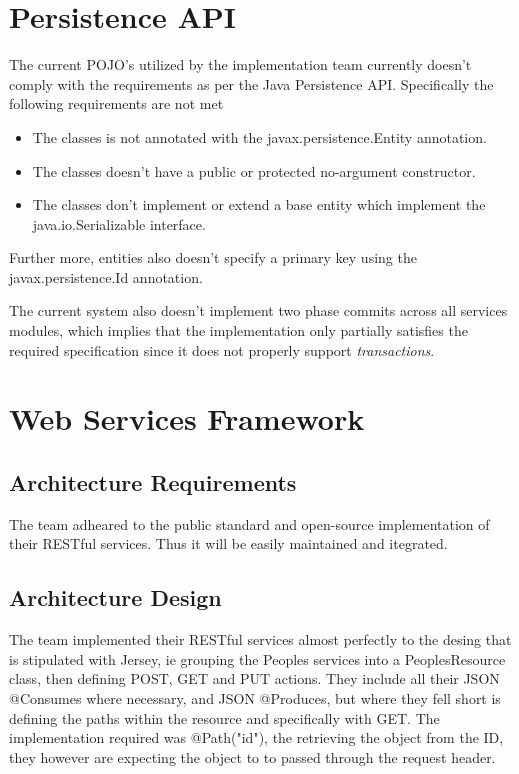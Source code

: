 \documentclass[a4paper,10pt]{article}
\begin{document}
\section{Persistence API}
The current POJO's utilized by the implementation team currently doesn't comply with the requirements as per the Java Persistence API.  Specifically the following requirements are not met
\begin{itemize}
	\item The classes is not annotated with the javax.persistence.Entity annotation.
	\item The classes doesn't have a public or protected no-argument constructor.
	\item The classes don't implement or extend a base entity which implement the java.io.Serializable interface.
\end{itemize}

Further more, entities also doesn't specify a primary key using the javax.persistence.Id annotation.

The current system also doesn't implement two phase commits across all services modules, which implies that the implementation only partially satisfies the required specification since it does not
properly support \textit{transactions}.

\section{Web Services Framework}
  \subsection{Architecture Requirements}
    The team adheared to the public standard and open-source implementation of their RESTful services. Thus it will be easily maintained and itegrated.
  \subsection{Architecture Design}
    The team implemented their RESTful services almost perfectly to the desing that is stipulated with Jersey, ie grouping the Peoples services into a PeoplesResource class, then defining POST, GET and PUT actions. They include all their JSON @Consumes where necessary, and JSON @Produces, but where they fell short is defining the paths within the resource and specifically with GET. The implementation required was @Path("{id}"), the retrieving the object from the ID, they however are expecting the object to to passed through the request header.
\end{document}
